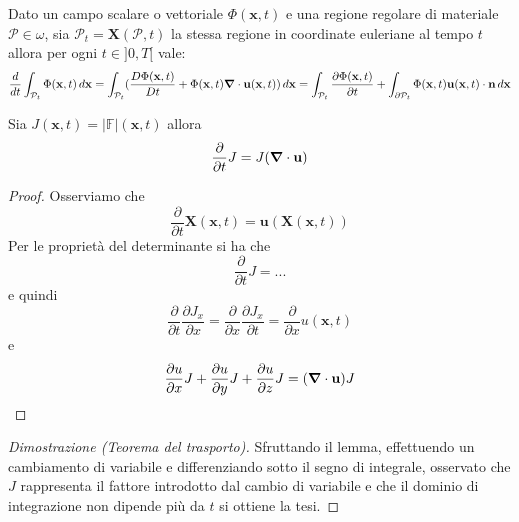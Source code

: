\begin{theorem}
Dato un campo scalare o vettoriale $\Phi(\mathbf{x},t)$ e una regione regolare di materiale $\mathcal{P}\in\omega$, sia $\mathcal{P}_{t} = \mathbf{X}(\mathcal{P},t)$ la stessa regione in coordinate euleriane al tempo $t$ allora per ogni $t\in ]0,T[$ vale:
\begin{equation}
\frac{d}{dt}\int_{\mathcal{P}_{t}}\Phi(\mathbf{x},t)\,d\mathbf{x} = \int_{\mathcal{P}_{t}}(\frac{D\Phi(\mathbf{x},t)}{Dt}+\Phi(\mathbf{x},t)\boldsymbol{\nabla}\cdot\mathbf{u}(\mathbf{x},t))\,d\mathbf{x}
= \int_{\mathcal{P}_{t}}\frac{\partial\Phi(\mathbf{x},t)}{\partial t}+ \int_{\partial\mathcal{P}_{t}}\Phi(\mathbf{x},t)\mathbf{u}(\mathbf{x},t)\cdot\mathbf{n}\,d\mathbf{x}
\end{equation}
\end{theorem}
\begin{lemma}
Sia $J(\mathbf{x},t)=|\mathbb{F}|(\mathbf{x},t)$ allora
\begin{equation}
\frac{\partial}{\partial t}J = J (\boldsymbol{\nabla} \cdot \mathbf{u} )
\end{equation}
\end{lemma}
\begin{proof}
Osserviamo che 
\begin{equation}
\frac{\partial}{\partial t}\mathbf{X}(\mathbf{x},t) = \mathbf{u}(\mathbf{X}(\mathbf{x},t))
\end{equation}
Per le proprietà del determinante si ha che
\begin{equation}
\frac{\partial}{\partial t}J = ...
\end{equation}
e quindi
\begin{equation}
\frac{\partial}{\partial t}\frac{\partial J_x}{\partial x} =
\frac{\partial}{\partial x}\frac{\partial J_x}{\partial t} = 
\frac{\partial}{\partial x}u(\mathbf{x},t)
\end{equation}
e 
\begin{equation}
\frac{\partial u}{\partial x} J + \frac{\partial u}{\partial y} J +\frac{\partial u}{\partial z} J = (\boldsymbol{\nabla} \cdot \mathbf{u}) J
\end{equation}
\end{proof}
\begin{proof}[Dimostrazione (Teorema del trasporto)]
Sfruttando il lemma, effettuendo un cambiamento di variabile e differenziando sotto il segno di integrale, osservato che $J$ rappresenta il fattore introdotto dal cambio di variabile e che il dominio di integrazione non dipende più da $t$ si ottiene la tesi.
\end{proof}

